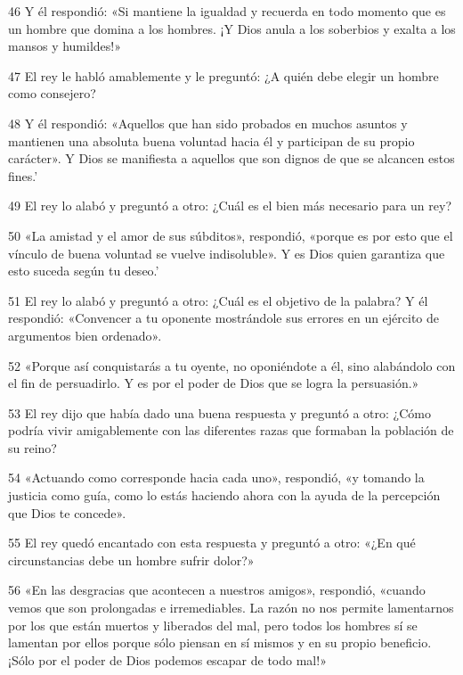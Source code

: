 \par 46 Y él respondió: «Si mantiene la igualdad y recuerda en todo momento que es un hombre que domina a los hombres. ¡Y Dios anula a los soberbios y exalta a los mansos y humildes!»

\par 47 El rey le habló amablemente y le preguntó: ¿A quién debe elegir un hombre como consejero?

\par 48 Y él respondió: «Aquellos que han sido probados en muchos asuntos y mantienen una absoluta buena voluntad hacia él y participan de su propio carácter». Y Dios se manifiesta a aquellos que son dignos de que se alcancen estos fines.'

\par 49 El rey lo alabó y preguntó a otro: ¿Cuál es el bien más necesario para un rey?

\par 50 «La amistad y el amor de sus súbditos», respondió, «porque es por esto que el vínculo de buena voluntad se vuelve indisoluble». Y es Dios quien garantiza que esto suceda según tu deseo.'

\par 51 El rey lo alabó y preguntó a otro: ¿Cuál es el objetivo de la palabra? Y él respondió: «Convencer a tu oponente mostrándole sus errores en un ejército de argumentos bien ordenado».

\par 52 «Porque así conquistarás a tu oyente, no oponiéndote a él, sino alabándolo con el fin de persuadirlo. Y es por el poder de Dios que se logra la persuasión.»

\par 53 El rey dijo que había dado una buena respuesta y preguntó a otro: ¿Cómo podría vivir amigablemente con las diferentes razas que formaban la población de su reino?

\par 54 «Actuando como corresponde hacia cada uno», respondió, «y tomando la justicia como guía, como lo estás haciendo ahora con la ayuda de la percepción que Dios te concede».

\par 55 El rey quedó encantado con esta respuesta y preguntó a otro: «¿En qué circunstancias debe un hombre sufrir dolor?»

\par 56 «En las desgracias que acontecen a nuestros amigos», respondió, «cuando vemos que son prolongadas e irremediables. La razón no nos permite lamentarnos por los que están muertos y liberados del mal, pero todos los hombres sí se lamentan por ellos porque sólo piensan en sí mismos y en su propio beneficio. ¡Sólo por el poder de Dios podemos escapar de todo mal!»

